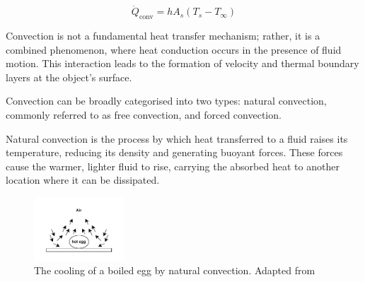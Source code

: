 \begin{equation}
    \dot{Q}_\text{conv} = hA_s(T_s-T_\infty)
    \label{eq:rate_of_convective_heat_transfer_function}
\end{equation}

Convection is not a fundamental heat transfer mechanism; rather, it is a combined phenomenon, where heat conduction occurs in the presence of fluid motion. This interaction leads to the formation of velocity and thermal boundary layers at the object's surface. \cite{Cengel2014FundamentalsConvection}\par
Convection can be broadly categorised into two types: natural convection, commonly referred to as free convection, and forced convection.\par

Natural convection is the process by which heat transferred to a fluid raises its temperature, reducing its density and generating buoyant forces. These forces cause the warmer, lighter fluid to rise, carrying the absorbed heat to another location where it can be dissipated. \cite{Zohuri2020ThermosyphonApplications}\par

\begin{figure}[ht]
    \centering
    \includegraphics[width=0.3\textwidth]{Figures/cooling_of_boiled_egg_natural_convection.pdf}
    \caption{The cooling of a boiled egg by natural convection. Adapted from \cite{Cengel2014IntroductionConcepts}}
    \label{fig:cooling_of_boiled_egg_natural_convection}
\end{figure}







\pagebreak

